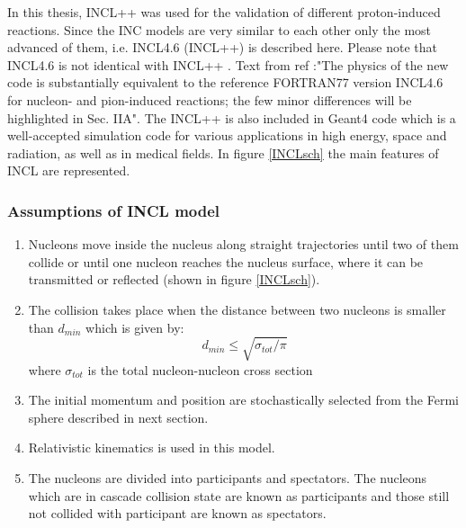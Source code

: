 In this thesis, INCL++ was used for the validation of different proton-induced reactions. Since the INC models are very similar to each other only the most advanced of them, i.e. INCL4.6 (INCL++) is described here. Please note that INCL4.6 \cite{INCLboudard2013new} is not identical with INCL++ \cite{INCLMancusi2014}. Text from ref\cite{INCLMancusi2014} :"The physics of the new code is substantially equivalent to the reference FORTRAN77 version INCL4.6 for nucleon- and pion-induced reactions; the few minor differences will be highlighted in Sec. IIA". The  INCL++ is also included in Geant4\cite{Geant_AGOSTINELLI2003250} code which is a well-accepted simulation code for various applications in high energy, space and radiation, as well as in medical fields. In figure \ref{INCLsch} the main features of INCL are represented.

\subsubsection{Assumptions of INCL\cite{INCLboudard2002intranuclear} model}\label{FeaOFINCL}

\begin{enumerate}[label=(\roman*)] 
	
	\item Nucleons move inside the nucleus along straight trajectories until two of them collide or until one nucleon reaches the nucleus surface, where it can be transmitted or reflected (shown in figure \ref{INCLsch}).
	\item The collision takes place when the distance between two nucleons is smaller than $d_{min}$ which is given by:
	\begin{equation}
		d_{min}\leq\sqrt{\sigma_{tot}/\pi}
	\end{equation}
	where $\sigma_{tot}$ is the total nucleon-nucleon cross section
	\item The initial momentum and position are stochastically selected from the Fermi sphere described in next section.
	\item Relativistic kinematics is used in this model.
	\item The nucleons are divided into participants and spectators. The nucleons which are in cascade collision state are known as participants and those still not collided with participant are known as spectators.
\end{enumerate}


